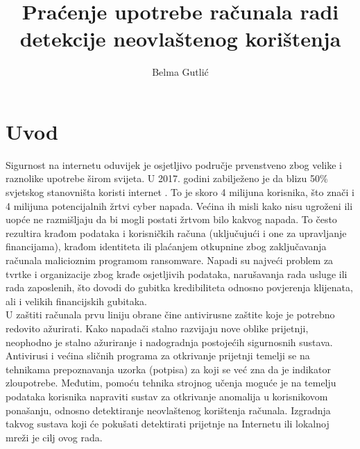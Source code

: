 \documentclass[times, utf8, diplomski]{fer}
\begin{document}

\title{Praćenje upotrebe računala radi detekcije neovlaštenog korištenja}

\author{Belma Gutlić}

\maketitle

\izvornik

\zahvala{}

\tableofcontents

\chapter{Uvod}
Sigurnost na internetu oduvijek je osjetljivo područje prvenstveno zbog velike i raznolike upotrebe širom svijeta. U 2017. godini zabilježeno je da blizu 50\% svjetskog stanovništa koristi internet \citep{internet-stats}. To je skoro 4 milijuna korisnika, što znači i 4 milijuna potencijalnih žrtvi cyber napada. Većina ih misli kako nisu ugroženi ili uopće ne razmišljaju da bi mogli postati žrtvom bilo kakvog napada. To često rezultira krađom podataka i korisničkih računa (uključujući i one za upravljanje financijama), krađom identiteta ili plaćanjem otkupnine zbog zaključavanja računala malicioznim programom ransomware. Napadi su najveći problem za tvrtke i organizacije zbog krađe osjetljivih podataka, narušavanja rada usluge ili rada zaposlenih, što dovodi do gubitka kredibiliteta odnosno povjerenja klijenata, ali i velikih financijskih gubitaka.\\

U zaštiti računala prvu liniju obrane čine antivirusne zaštite koje je potrebno redovito ažurirati. Kako napadači stalno razvijaju nove oblike prijetnji, neophodno je stalno ažuriranje i nadogradnja postojećih sigurnosnih sustava. Antivirusi i većina sličnih programa za otkrivanje prijetnji temelji se na tehnikama prepoznavanja uzorka (potpisa) za koji se već zna da je indikator zloupotrebe. Međutim, pomoću tehnika strojnog učenja moguće je na temelju podataka korisnika napraviti sustav za otkrivanje anomalija u korisnikovom ponašanju, odnosno detektiranje neovlaštenog korištenja računala. Izgradnja takvog sustava koji će pokušati detektirati prijetnje na Internetu ili lokalnoj mreži je cilj ovog rada.\\
\end{document}
